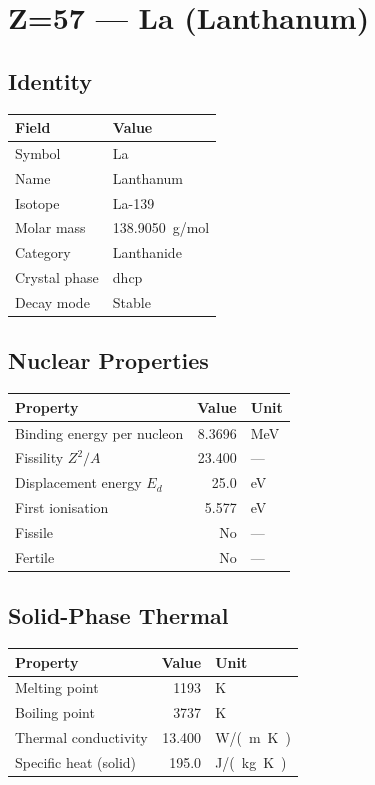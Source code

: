 \documentclass[11pt,a4paper]{article}
\begin{document}
\newpage

\section{Z=57 --- La (Lanthanum)}
\label{sec:Z57}

\subsection{Identity}
\begin{tabular}{ll}
  \toprule
  Field & Value \\
  \midrule
  Symbol & La \\
  Name & Lanthanum \\
  Isotope & La-139 \\
  Molar mass & \SI{138.9050}{g/mol} \\
  Category & Lanthanide \\
  Crystal phase & dhcp \\
  Decay mode & Stable \\
  \bottomrule
\end{tabular}

\subsection{Nuclear Properties}
\begin{tabular}{lrl}
  \toprule
  Property & Value & Unit \\
  \midrule
  Binding energy per nucleon & 8.3696 & \si{MeV} \\
  Fissility $Z^2/A$ & 23.400 & --- \\
  Displacement energy $E_d$ & 25.0 & \si{eV} \\
  First ionisation & 5.577 & \si{eV} \\
  Fissile & No & --- \\
  Fertile & No & --- \\
  \bottomrule
\end{tabular}

\subsection{Solid-Phase Thermal}
\begin{tabular}{lrl}
  \toprule
  Property & Value & Unit \\
  \midrule
  Melting point & 1193 & \si{K} \\
  Boiling point & 3737 & \si{K} \\
  Thermal conductivity & 13.400 & \si{W/(m.K)} \\
  Specific heat (solid) & 195.0 & \si{J/(kg.K)} \\
  \bottomrule
\end{tabular}
\end{document}
